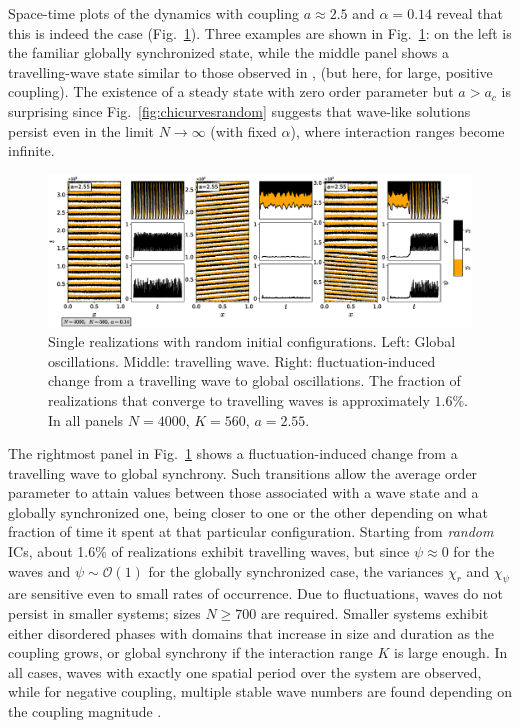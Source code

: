 Space-time plots of the dynamics with coupling $a\approx 2.5$ and $\alpha=0.14$ reveal that this is indeed the case
(Fig.~\ref{fig:trialpanel2}).  Three examples are shown in Fig.~\ref{fig:trialpanel2}: on the left is the familiar globally
synchronized state, while the middle panel shows a travelling-wave state similar to those observed in \cite{escaff2014arrays}, (but
here, for large, positive coupling). The existence of a steady state with zero order parameter but $a>a_c$ is surprising since
Fig.~\ref{fig:chicurvesrandom} suggests that wave-like solutions persist even in the limit $N\to\infty$ (with fixed $\alpha$), where
interaction ranges become infinite.

\begin{figure}
\begin{center}
    \includegraphics[width=1.\textwidth]{fig/articuno_figure_panel2.eps}
\caption{\label{fig:trialpanel2} Single realizations with random initial configurations. Left: Global oscillations. Middle: travelling
wave. Right: fluctuation-induced change from a travelling wave to global oscillations.  The fraction of realizations that converge to
travelling waves is approximately $1.6\%$. In all panels $N=4000$, $K=560$, $a=2.55$.}
\end{center}
\end{figure}

The rightmost panel in Fig.~\ref{fig:trialpanel2} shows a fluctuation-induced change from a travelling wave to global synchrony.  Such
transitions allow the average order parameter to attain values between those associated with a wave state and a globally synchronized
one, being closer to one or the other depending on what fraction of time it spent at that particular configuration.  Starting from
\textit{random} ICs, about 1.6\% of realizations exhibit travelling waves, but since $\psi\approx 0$ for the waves and $\psi \sim
\mathcal{O}(1)$ for the globally synchronized case, the variances $\chi_r$ and $\chi_{\psi}$ are sensitive even to small rates of
occurrence.  Due to fluctuations, waves do not persist in smaller systems; sizes $N \geq 700$ are required. Smaller systems exhibit
either disordered phases with domains that increase in size and duration as the coupling grows, or global synchrony if the interaction
range $K$ is large enough.  In all cases, waves with exactly one spatial period over the system are observed, while for negative
coupling, multiple stable wave numbers are found depending on the coupling magnitude \cite{escaff2014arrays}.

